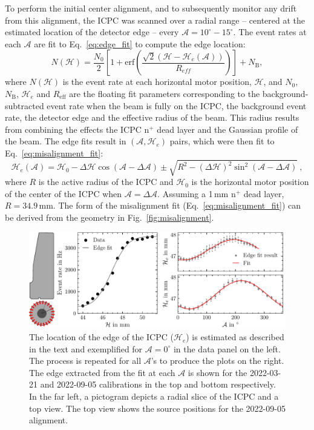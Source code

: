 To perform the initial center alignment, and to subsequently monitor any drift from this alignment, the ICPC was scanned over a radial range -- centered at the estimated location of the detector edge -- every $\mathcal{A} = 10^{\circ} - 15^{\circ}$. The event rates at each $\mathcal{A}$ are fit to Eq.~\ref{eq:edge_fit} to compute the edge location:
\begin{equation}
    N(\mathcal{H}) = \dfrac{N_0}{2} \left[ 1 + \text{erf}\left(\dfrac{\sqrt{2} (\mathcal{H} - \mathcal{H}_e(\mathcal{A}))}{R_{eff}}\right) \right] + N_\text{B},
	\label{eq:edge_fit}
\end{equation}
where $N(\mathcal{H})$ is the event rate at each horizontal motor position, $\mathcal{H}$, and $N_0$, $N_\text{B}$, $\mathcal{H}_e$ and $R_\text{eff}$ are the floating fit parameters corresponding to the background-subtracted event rate when the \CsS{} beam is fully on the ICPC, the background event rate, the detector edge and the effective radius of the beam. This radius results from combining the effects the ICPC n$^+$ dead layer and the Gaussian profile of the \CsS{} beam. The edge fits result in $(\mathcal{A}, \mathcal{H}_e)$ pairs, which were then fit to Eq.~\ref{eq:misalignment_fit}: 
\begin{equation}
	\mathcal{H}_e(\mathcal{A}) = \mathcal{H}_0 - \Delta \mathcal{H} \cos(\mathcal{A} - \Delta\mathcal{A}) \pm \sqrt{R^2 - (\Delta \mathcal{H})^2 \sin^2(\mathcal{A} - \Delta\mathcal{A})}~,
	\label{eq:misalignment_fit}
\end{equation}
where $R$ is the active radius of the ICPC and $\mathcal{H}_0$ is the horizontal motor position of the center of the ICPC when $\mathcal{A} = \Delta \mathcal{A}$. Assuming a 1\,mm n$^+$ dead layer, $R = 34.9$\,mm. The form of the misalignment fit (Eq.~\ref{eq:misalignment_fit}) can be derived from the geometry in Fig.~\ref{fig:misalignment}. 
\begin{figure}[htb]
    \centering
    \includegraphics[width=6in]{figs/integration/center_alignment.pdf}
    \caption{The location of the edge of the ICPC ($\mathcal{H}_e$) is estimated as described in the text and exemplified for $\mathcal{A} = 0^{\circ}$ in the data panel on the left. The process is repeated for all $\mathcal{A}$'s to produce the plots on the right. The edge extracted from the fit at each $\mathcal{A}$ is shown for the 2022-03-21 and 2022-09-05 calibrations in the top and bottom respectively. In the far left, a pictogram depicts a radial slice of the ICPC and a top view. The top view shows the \CsS{} source positions for the 2022-09-05 alignment.}
    \label{fig:center_alignment}
\end{figure}


